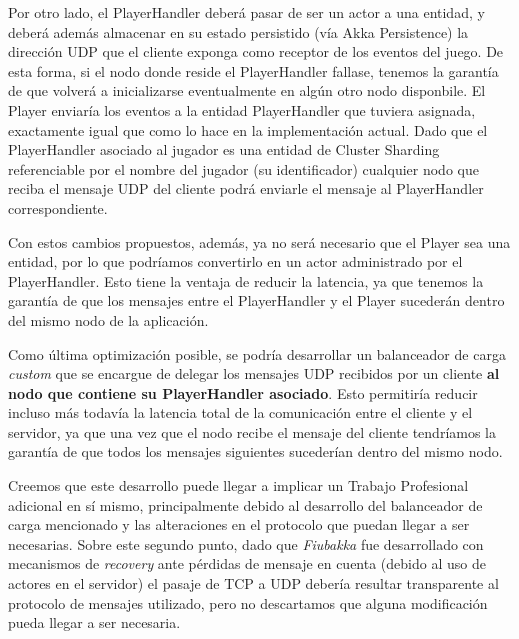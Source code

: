 Por otro lado, el PlayerHandler deberá pasar de ser un actor a una entidad, y deberá además almacenar en su estado persistido (vía Akka Persistence) la dirección UDP que el cliente exponga como receptor de los eventos del juego.
De esta forma, si el nodo donde reside el PlayerHandler fallase, tenemos la garantía de que volverá a inicializarse eventualmente en algún otro nodo disponbile. El Player enviaría los eventos a la entidad PlayerHandler que tuviera asignada,
exactamente igual que como lo hace en la implementación actual.
Dado que el PlayerHandler asociado al jugador es una entidad de Cluster Sharding referenciable por el nombre del jugador (su identificador) cualquier nodo que reciba el mensaje UDP del cliente podrá enviarle el mensaje al PlayerHandler correspondiente.

Con estos cambios propuestos, además, ya no será necesario que el Player sea una entidad, por lo que podríamos convertirlo en un actor administrado por el PlayerHandler. Esto tiene la ventaja de reducir la latencia, ya que tenemos la garantía de que los mensajes
entre el PlayerHandler y el Player sucederán dentro del mismo nodo de la aplicación.

Como última optimización posible, se podría desarrollar un balanceador de carga \textit{custom} que se encargue de delegar los mensajes UDP recibidos por un cliente \textbf{al nodo que contiene su PlayerHandler asociado}.
Esto permitiría reducir incluso más todavía la latencia total de la comunicación entre el cliente y el servidor, ya que una vez que el nodo recibe el mensaje del cliente tendríamos la garantía de que todos los mensajes siguientes sucederían
dentro del mismo nodo.

Creemos que este desarrollo puede llegar a implicar un Trabajo Profesional adicional en sí mismo, principalmente debido al desarrollo del balanceador de carga mencionado y las alteraciones en el protocolo que puedan llegar a ser necesarias. Sobre este segundo punto,
dado que \textit{Fiubakka} fue desarrollado con mecanismos de \textit{recovery} ante pérdidas de mensaje en cuenta (debido al uso de actores en el servidor) el pasaje de TCP a UDP debería resultar transparente al protocolo de mensajes utilizado, pero no descartamos
que alguna modificación pueda llegar a ser necesaria.
